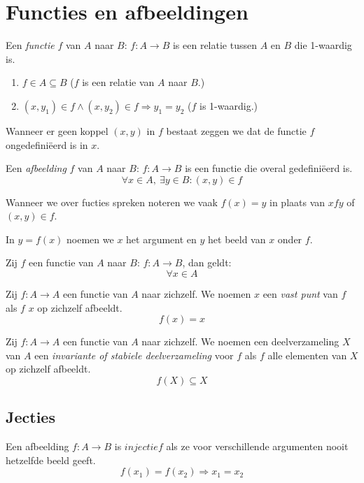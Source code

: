 \documentclass[main.tex]{subfiles}
\begin{document}
\chapter{Functies en afbeeldingen}
\label{cha:functies-en-afbeeldingen}

\begin{de}
  Een \emph{functie} $f$ van $A$ naar $B$: $f: A \rightarrow B$ is een relatie tussen $A$ en $B$ die 1-waardig is.
  \begin{enumerate}
  \item $f \in A \subseteq B$ ($f$ is een relatie van $A$ naar $B$.)
  \item $(x,y_{1}) \in f \wedge (x,y_{2}) \in f \Rightarrow y_{1} = y_{2}$ ($f$ is 1-waardig.)
  \end{enumerate}
\end{de}

\begin{de}
  Wanneer er geen koppel $(x,y)$ in $f$ bestaat zeggen we dat de functie $f$ ongedefini\"eerd is in $x$.
\end{de}

\begin{de}
  Een \emph{afbeelding} $f$ van $A$ naar $B$: $f: A \rightarrow B$ is een functie die overal gedefini\"eerd is.
  \[ \forall x \in A,\ \exists y \in B: (x,y) \in f \]
\end{de}

\begin{de}
  Wanneer we over fucties spreken noteren we vaak $f(x) = y$ in plaats van $x f y$ of $(x,y) \in f$.
\end{de}

\begin{de}
  In $y = f(x)$ noemen we $x$ het argument en $y$ het beeld van $x$ onder $f$.
\end{de}

\begin{st}
  Zij $f$ een functie van $A$ naar $B$: $f: A \rightarrow B$, dan geldt:
  \[ \forall x \in A\]
\end{st}

\begin{de}
  Zij $f: A \rightarrow A$ een functie van $A$ naar zichzelf.
  We noemen $x$ een \emph{vast punt} van $f$ als $f$ $x$ op zichzelf afbeeldt.
  \[ f(x) = x \]
\end{de}

\begin{de}
  Zij $f: A \rightarrow A$ een functie van $A$ naar zichzelf.
  We noemen een deelverzameling $X$ van $A$ een \emph{invariante of stabiele deelverzameling} voor $f$ als $f$ alle elementen van $X$ op zichzelf afbeeldt.
  \[ f(X) \subseteq X \]
\end{de}

\section{Jecties}
\label{sec:jecties}

\begin{de}
  Een afbeelding $f: A \rightarrow B$ is $injectief$ als ze voor verschillende argumenten nooit hetzelfde beeld geeft.
  \[ f(x_{1}) = f(x_{2}) \Rightarrow x_{1}= x_{2} \]
\end{de}
\end{document}
